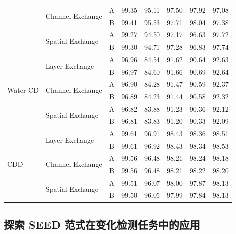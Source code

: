 \begin{table}[!htbp]
\begin{tabularx}{\textwidth}{l X c X X X X X}
            \cline{2-8}
            & \multirow{2}{*}{Channel Exchange} & A & 99.35 & 95.11 & 97.50 & 97.92 & 97.08 \\
            &                                   & B & 99.41 & 95.53 & 97.71 & 98.04 & 97.38 \\
            \cline{2-8}
            & \multirow{2}{*}{Spatial Exchange} & A & 99.27 & 94.50 & 97.17 & 96.63 & 97.72 \\
            &                                   & B & 99.30 & 94.71 & 97.28 & 96.83 & 97.74 \\
        \hline
        \multirow{6}{*}{Water-CD}
            & \multirow{2}{*}{Layer Exchange}   & A & 96.96 & 84.54 & 91.62 & 90.64 & 92.63 \\
            &                                   & B & 96.97 & 84.60 & 91.66 & 90.69 & 92.64 \\
            \cline{2-8}
            & \multirow{2}{*}{Channel Exchange} & A & 96.90 & 84.28 & 91.47 & 90.59 & 92.37 \\
            &                                   & B & 96.89 & 84.23 & 91.44 & 90.58 & 92.32 \\
            \cline{2-8}
            & \multirow{2}{*}{Spatial Exchange} & A & 96.82 & 83.88 & 91.23 & 90.36 & 92.12 \\
            &                                   & B & 96.81 & 83.83 & 91.20 & 90.33 & 92.09 \\
        \hline
        \multirow{6}{*}{CDD}
            & \multirow{2}{*}{Layer Exchange}   & A & 99.61 & 96.91 & 98.43 & 98.36 & 98.51 \\
            &                                   & B & 99.61 & 96.92 & 98.43 & 98.34 & 98.53 \\
            \cline{2-8}
            & \multirow{2}{*}{Channel Exchange} & A & 99.56 & 96.48 & 98.21 & 98.24 & 98.18 \\
            &                                   & B & 99.56 & 96.48 & 98.21 & 98.22 & 98.20 \\
            \cline{2-8}
            & \multirow{2}{*}{Spatial Exchange} & A & 99.51 & 96.07 & 98.00 & 97.87 & 98.13 \\
            &                                   & B & 99.50 & 96.05 & 97.99 & 97.84 & 98.13 \\
        \hline
    \end{tabularx}
\end{table}

\subsection{探索 SEED 范式在变化检测任务中的应用}  
